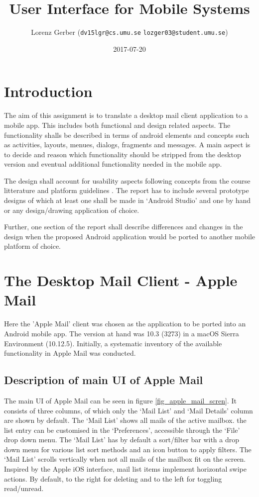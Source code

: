 \documentclass[a4paper,11pt,twoside]{article}
\title{User Interface for Mobile Systems}
\author{Lorenz Gerber ({\tt{dv15lgr@cs.umu.se}} {\tt{lozger03@student.umu.se}})}
\date{2017-07-20}
\begin{document}
\lstset{language=C}
\maketitle
\thispagestyle{empty}
\newpage
\tableofcontents
\thispagestyle{empty}
\newpage

\clearpage
{}

\section{Introduction}
The aim of this assignment is to translate a desktop mail client application to
a mobile app. This includes both functional and design related aspects. The
functionality shalls be described in terms of android elements and concepts such
as activities, layouts, menues, dialogs, fragments and messages. A main aspect is
to decide and reason which functionality should be stripped from the desktop version
and eventual additional functionality needed in the mobile app.

The design shall account for usability aspects following concepts from the
course litterature \cite{clark2015} and platform guidelines \cite{materialdesign}.
The report has to include several prototype designs of which at least one shall be
made in `Android Studio' and one by hand or any design/drawing application of choice.

Further, one section of the report shall describe differences and changes in the
design when the proposed Android application would be ported to another mobile
platform of choice.

\section{The Desktop Mail Client - Apple Mail}
Here the 'Apple Mail' client was chosen as the application to be ported into
an Android mobile app. The version at hand was 10.3 (3273) in a macOS Sierra
Environment (10.12.5). Initially, a systematic inventory of the available
functionality in Apple Mail was conducted.

\subsection{Description of main UI of Apple Mail}
The main UI of Apple Mail can be seen in figure \ref{fig_apple_mail_scren}.
It consists of three columns, of which only the `Mail List' and `Mail Details'
column are shown by default. The `Mail List' shows all mails of the active mailbox.
the list entry can be customised in the `Preferences', accessible through the `File'
drop down menu. The `Mail List' has by default a sort/filter bar with a drop down
menu for various list sort methods and an icon button to apply filters. The `Mail
List' scrolls vertically when not all mails of the mailbox fit on the screen.
Inspired by the Apple iOS interface, mail list items implement horizontal swipe
actions. By default, to the right for deleting and to the left for toggling
read/unread.
\end{document}
